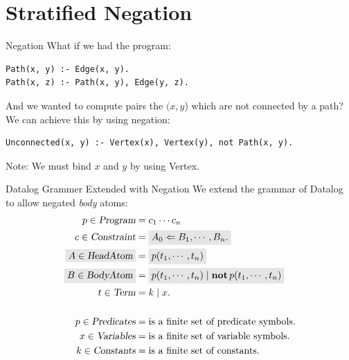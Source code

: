 \section{Stratified Negation}

\begin{frame}[fragile]{Negation}
What if we had the program:

\begin{lstlisting}[language=flix,xleftmargin=0.8cm]
Path(x, y) :- Edge(x, y).
Path(x, z) :- Path(x, y), Edge(y, z).
\end{lstlisting}

And we wanted to compute pairs the $(x, y$) which are not connected by a path?
We can achieve this by using negation:

\begin{lstlisting}[language=flix,xleftmargin=0.8cm]
Unconnected(x, y) :- Vertex(x), Vertex(y), not Path(x, y).
\end{lstlisting}

Note: We must bind $x$ and $y$ by using \textsf{Vertex}.
\end{frame}

\begin{frame}{Datalog Grammer Extended with Negation}
We extend the grammar of Datalog to allow negated \emph{body} atoms:
{
\large
\begin{align*}
p \in \textsl{Program}      &= c_1 \cdots c_n \\
c \in \textsl{Constraint}   &= \Highlight{A_0 \Leftarrow B_1, \cdots, B_n.} \\ 
\Highlight{A \in \textsl{HeadAtom}}     &= \Highlight{p(t_1, \cdots, t_n)} \\
\Highlight{B \in \textsl{BodyAtom}}     &= \Highlight{p(t_1, \cdots, t_n) \mid \text{\textbf{not}} \, p(t_1, \cdots, t_n)} \\
t \in \textsl{Term}         &= k \mid x. \\
\\
p \in \textsl{Predicates}   & = \text{is a finite set of predicate symbols.} \\
x \in \textsl{Variables}    & = \text{is a finite set of variable symbols.} \\
k \in \textsl{Constants}    & = \text{is a finite set of constants.}
\end{align*}
}
\end{frame}

